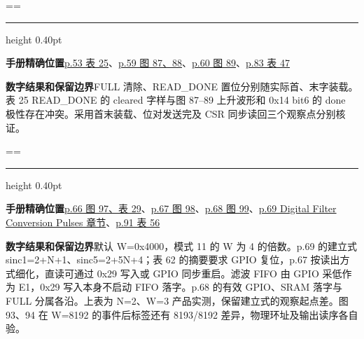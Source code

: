 \documentclass[UTF8,fontset=none,zihao=-4,a4paper]{ctexart}
\newcommand{\TraceItem}[1]{%
  \par{\color{TraceRule}\hrule height 0.40pt}\nobreak\smallskip%
  \noindent{\bfseries\color{TraceTitle}#1\par}\nopagebreak[4]}
\newcommand{\TraceField}[2]{%
  \par\noindent\textbf{\textcolor{TraceAccent}{#1}}\enspace#2\par}
\newenvironment{TraceCard}
  {\par\addvspace{4pt}\setbox\TraceCardBox=\vbox\bgroup\hsize=\linewidth}
  {\par\egroup
   \ifdim\dimexpr\ht\TraceCardBox+\dp\TraceCardBox\relax<0.30\textheight
     \box\TraceCardBox
   \else
     \unvbox\TraceCardBox
   \fi}
\begin{document}
\begin{TraceCard}
\TraceItem{图 89 FIFO 状态}
\TraceField{手册精确位置}{\href{https://www.analog.com/media/en/technical-documentation/data-sheets/ad4080.pdf\#page=53}{p.53 表 25}、\allowbreak{}\href{https://www.analog.com/media/en/technical-documentation/data-sheets/ad4080.pdf\#page=59}{p.59 图 87、\allowbreak{}88}、\allowbreak{}\href{https://www.analog.com/media/en/technical-documentation/data-sheets/ad4080.pdf\#page=60}{p.60 图 89}、\allowbreak{}\href{https://www.analog.com/media/en/technical-documentation/data-sheets/ad4080.pdf\#page=83}{p.83 表 47}}
\TraceField{数字结果和保留边界}{FULL 清除、\allowbreak{}READ\_\relax{}DONE 置位分别随实际首、\allowbreak{}末字装载。表 25 READ\_\penalty150\relax{}DONE 的 cleared 字样与图 87–89 上升波形和 0x14 bit6 的 done 极性存在冲突。采用首末装载、\allowbreak{}位对发送完及 CSR 同步读回三个观察点分别核证。}
\end{TraceCard}
\begin{TraceCard}
\TraceItem{滤波建立与水位}
\TraceField{手册精确位置}{\href{https://www.analog.com/media/en/technical-documentation/data-sheets/ad4080.pdf\#page=66}{p.66 图 97、\allowbreak{}表 29}、\allowbreak{}\href{https://www.analog.com/media/en/technical-documentation/data-sheets/ad4080.pdf\#page=67}{p.67 图 98}、\allowbreak{}\href{https://www.analog.com/media/en/technical-documentation/data-sheets/ad4080.pdf\#page=68}{p.68 图 99}、\allowbreak{}\href{https://www.analog.com/media/en/technical-documentation/data-sheets/ad4080.pdf\#page=69}{p.69 Digital Filter Conversion Pulses 章节}、\allowbreak{}\href{https://www.analog.com/media/en/technical-documentation/data-sheets/ad4080.pdf\#page=91}{p.91 表 56}}
\TraceField{数字结果和保留边界}{默认 W=\relax{}0x4000，模式 11 的 W 为 4 的倍数。p.69 的建立式 sinc1=\penalty150\relax{}2+\penalty150\relax{}N+\penalty150\relax{}1、\allowbreak{}sinc5=\penalty150\relax{}2+\penalty150\relax{}5N+\penalty150\relax{}4；表 62 的摘要要求 GPIO 复位，p.67 按读出方式细化，直读可通过 0x29 写入或 GPIO 同步重启。滤波 FIFO 由 GPIO 采低作为 E1，0x29 写入本身不启动 FIFO 落字。p.68 的有效 GPIO、\allowbreak{}SRAM 落字与 FULL 分属各沿。上表为 N=2、\allowbreak{}W=3 产品实测，保留建立式的观察起点差。图 93、\allowbreak{}94 在 W=8192 的事件后标签还有 8193/\penalty150\relax{}8192 差异，物理环址及输出读序各自验。}
\end{TraceCard}
\end{document}
